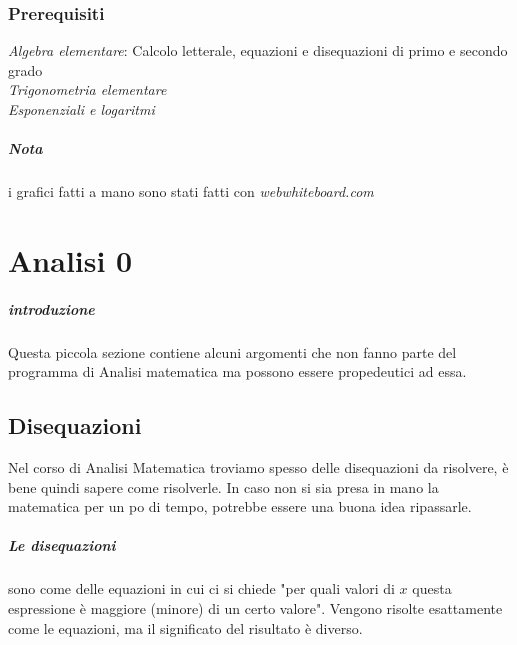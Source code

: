 \documentclass[12pt, a4paper, openany]{book}
\begin{document}
\subsection*{Prerequisiti}
\emph{Algebra elementare}: Calcolo letterale, equazioni e disequazioni di primo e secondo grado
\\\emph{Trigonometria elementare}
\\\emph{Esponenziali e logaritmi}

\paragraph*{Nota} i grafici fatti a mano sono stati fatti con \emph{webwhiteboard.com}
\chapter{Analisi 0}
\paragraph{introduzione}
Questa piccola sezione contiene alcuni argomenti che non fanno parte del programma di Analisi matematica ma possono essere propedeutici ad essa.

\section{Disequazioni}
Nel corso di Analisi Matematica troviamo spesso delle disequazioni da risolvere, è bene quindi sapere come risolverle.
In caso non si sia presa in mano la matematica per un po di tempo, potrebbe essere una buona idea ripassarle.

\paragraph*{Le disequazioni} sono come delle equazioni in cui ci si chiede "per quali valori di $x$ questa espressione è maggiore (minore) di un certo valore".
Vengono risolte esattamente come le equazioni, ma il significato del risultato è diverso.
\end{document}
